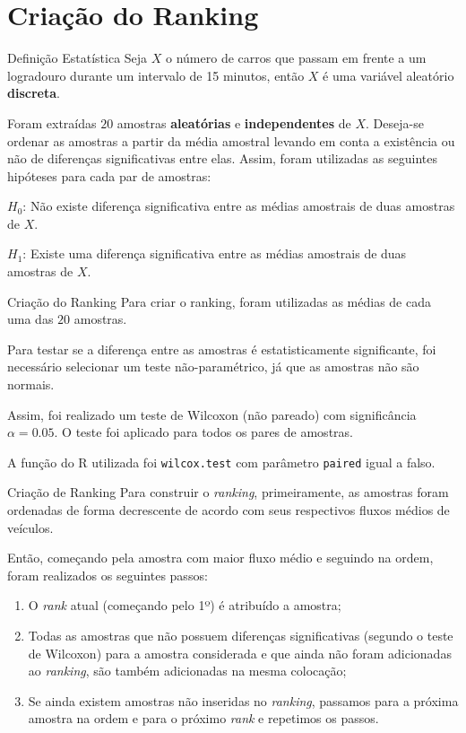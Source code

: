 \section{Criação do Ranking}

\begin{frame}{Definição Estatística}
Seja $X$ o número de carros que passam em frente a um logradouro durante um
intervalo de 15 minutos, então $X$ é uma variável aleatório \textbf{discreta}.

Foram extraídas $20$ amostras \textbf{aleatórias} e \textbf{independentes} de
$X$. Deseja-se ordenar as amostras a partir da média amostral levando em conta
a existência ou não de diferenças significativas entre elas. Assim, foram
utilizadas as seguintes hipóteses para cada par de amostras:

\vskip 0.5cm

$H_{0}$: Não existe diferença significativa entre as médias amostrais de duas
amostras de $X$.

$H_{1}$: Existe uma diferença significativa entre as médias amostrais de duas
amostras de $X$.
\end{frame}

\begin{frame}{Criação do Ranking}
Para criar o ranking, foram utilizadas as médias de cada uma das $20$ amostras.

\vskip 0.2cm

Para testar se a diferença entre as amostras é estatisticamente significante,
foi necessário selecionar um teste não-paramétrico, já que as amostras não são
normais.

\vskip 0.2cm

Assim, foi realizado um teste de Wilcoxon (não pareado) com significância
$\alpha = 0.05$. O teste foi aplicado para todos os pares de amostras.

\vskip 0.2cm

A função do R utilizada foi \texttt{wilcox.test} com parâmetro \texttt{paired}
igual a falso.
\end{frame}

\begin{frame}{Criação de Ranking}
Para construir o \textit{ranking}, primeiramente, as amostras foram ordenadas de
forma decrescente de acordo com seus respectivos fluxos médios de veículos.

Então, começando pela amostra com maior fluxo médio e seguindo na ordem, foram
realizados os seguintes passos:
\begin{enumerate}
	\item O \textit{rank} atual (começando pelo 1º) é atribuído a amostra;
	\item Todas as amostras que não possuem diferenças significativas (segundo o
	teste de Wilcoxon) para a amostra considerada e que ainda não foram
	adicionadas ao \textit{ranking}, são também adicionadas na mesma colocação;
	\item Se ainda existem amostras não inseridas no \textit{ranking}, passamos
	para a próxima amostra na ordem e para o próximo \textit{rank} e repetimos
	os passos.
\end{enumerate}
\end{frame}

